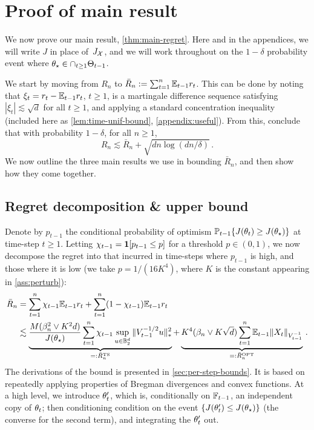 \section{Proof of main result} \label{sec:proof}
We now prove our main result, \cref{thm:main-regret}. Here and in the appendices, we will write $J$ in place of~$J_{\mathcal{X}}$, and we will work throughout on the $1-\delta$ probability event where $\theta_\star \in \cap_{t \geq 1} \Theta_{t-1}$. 

We start by moving from $R_n$ to $\bar R_n := \sum_{t=1}^n \mathbb{E}_{t-1} r_t$. This can be done by noting that $\xi_t = r_t - \mathbb{E}_{t-1} r_t$, $t \geq 1$, is a martingale difference sequence 
satisfying $|\xi_t| \lesssim \sqrt{d}$ for all $t \geq 1$, and applying a standard concentration inequality (included here as \cref{lem:time-unif-bound}, \cref{appendix:useful}). From this, conclude that with probability $1-\delta$, for all $n \geq 1$,
$$
  R_n \lesssim \bar R_n  +\sqrt{dn \log(dn/\delta)}\,.
$$
We now outline the three main results we use in bounding $\bar R_n$, and then show how they come together.

\newcommand{\RTS}{\bar{R}^{\text{TS}}_n}
\newcommand{\ROPT}{\bar{R}^{\text{OPT}}_n}
\newcommand{\tbet}{\tilde{\beta}_{t-1}}

\subsection{Regret decomposition \& upper bound} Denote by $p_{t-1}$ the conditional probability of optimism $\mathbb{P}_{t-1}\{J(\theta_t) \geq J(\theta_\star)\}$ at time-step $t \geq 1$.  Letting $\chi_{t-1} = \mathbf{1}[p_{t-1} \leq p]$ for a threshold $p \in (0,1)$, we now decompose the regret into that incurred in time-steps where $p_{t-1}$ is high, and those where it is low (we take $p = 1/( 16 K^4)$, where $K$ is the constant appearing in \cref{ass:perturb}):
\begin{align}
  \bar R_n &= \sum_{t=1}^n  \chip \Et r_t  + \sum_{t=1}^n (1-\chip) \Et r_t \nonumber  \\
    &\lesssim \underbrace{ \frac{M (\beta_n^2 \vee K^2d)}{J(\thetaopt)}\sum_{t=1}^n \chip \sup_{u \in \Bd} \snorm{\Vt^{-1/2}u}^2}_{=: \RTS} + \underbrace{K^4 (\beta_n \vee K\sqrt{d})  \sum_{t=1}^n \Et \vinvnorm{X_t} }_{=: \ROPT}\,.\label{eq:regret-decomp}
\end{align}
The derivations of the bound is presented in \cref{sec:per-step-bounds}.  It is based on repeatedly applying properties of Bregman divergences and convex functions. At a high level, we introduce $\theta_t'$, which is, conditionally on $\mathbb{F}_{t-1}$, an independent copy of $\theta_t$; then  conditioning condition on the event $\{J(\theta'_t) \leq J(\theta_\star) \}$ (the converse for the second term), and integrating the $\theta_t'$ out.

